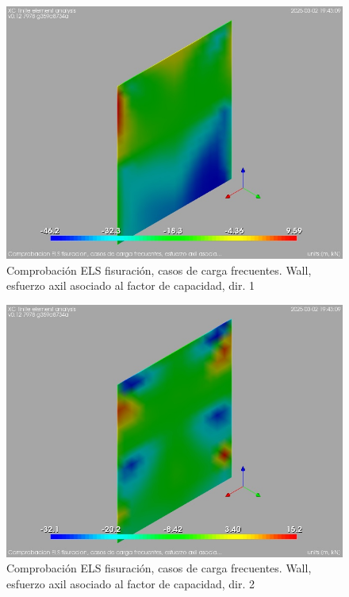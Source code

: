 \begin{figure}[ht]
\begin{center}
\includegraphics[width=\linewidth]{results/graphics/crackingSLS_freq/wallNSect1}
\caption{Comprobación ELS fisuración, casos de carga frecuentes. Wall, esfuerzo axil asociado al factor de capacidad, dir. 1}
\label{SLS_frequentLoadsCrackControlwallNSect1}
\end{center}
\end{figure}
\begin{figure}[ht]
\begin{center}
\includegraphics[width=\linewidth]{results/graphics/crackingSLS_freq/wallNSect2}
\caption{Comprobación ELS fisuración, casos de carga frecuentes. Wall, esfuerzo axil asociado al factor de capacidad, dir. 2}
\label{SLS_frequentLoadsCrackControlwallNSect2}
\end{center}
\end{figure}
